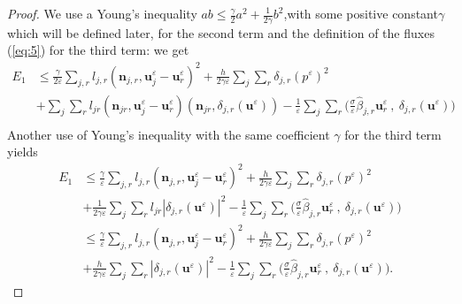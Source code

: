 \documentclass[a4paper,french,english,10pt]{article}
\newcommand\ljr{l_{jr}}
\newcommand\njr{\mathbf{n}_{jr}}
\newcommand\uu{\mathbf{u}}
\newcommand\eps{\varepsilon}
\begin{document}
\begin{proof}
We use a Young's inequality 
$ab\leq \frac\gamma2 a^2+\frac1{2\gamma} b^2$,with some positive constant$\gamma$ which will be defined later,   for the second term
and the definition of the fluxes (\ref{eq:5}) for the third term: we get
\begin{equation*}
\begin{aligned}
E_1 &\leq  \frac{\gamma }{2 \eps}\sum_{j,r}l_{j,r}(\textbf{n}_{j,r},\textbf{u}_j^{\eps}
-\textbf{u}_r^{\eps})^2 + \frac{h}{2\gamma\eps} \sum_j \sum_r  %
\delta_{j,r}(p^{\eps})^2 \\
&+
\sum_j \sum_r 
\ljr(\njr , \textbf{u}_j^{\eps}-\textbf{u}_r^{\eps} )(\njr ,
  \delta_{j,r}(\uu^{\eps}))
 -\frac{1}{\eps} \sum_j \sum_r \bigg(
\frac{\sigma}{\eps} \widehat{\beta}_{j,r}\textbf{u}_r^{\eps}\: , \:
\delta_{j,r}(\uu^{\eps} )\bigg) \\
\end{aligned}
\end{equation*}
Another use of Young's inequality with the same coefficient $\gamma$ for the third term
yields
\begin{equation*}
\begin{aligned}
E_1 &\leq  \frac{\gamma }{ \eps}\sum_{j,r}l_{j,r}(\textbf{n}_{j,r},\textbf{u}_j^{\eps}
-\textbf{u}_r^{\eps})^2 + \frac{h}{2\gamma\eps} \sum_j \sum_r %
\delta_{j,r}(p^{\eps})^2 
\\
&
+\frac{1}{2\gamma\eps} \sum_j \sum_r l_{jr}
|
\delta_{j,r}(\uu^{\eps})|^2 -\frac{1}{\eps} \sum_j \sum_r \bigg(
\frac{\sigma}{\eps} \widehat{\beta}_{j,r}\textbf{u}_r^{\eps}\: , \:
\delta_{j,r}(\uu^{\eps} )\bigg) \\
&\leq  \frac{\gamma }{ \eps}\sum_{j,r}l_{j,r}(\textbf{n}_{j,r},\textbf{u}_j^{\eps}
-\textbf{u}_r^{\eps})^2 + \frac{h}{2\gamma\eps} \sum_j \sum_r %
\delta_{j,r}(p^{\eps})^2 
\\
&
+\frac{h}{2\gamma\eps} \sum_j \sum_r 
|
\delta_{j,r}(\uu^{\eps})|^2 -\frac{1}{\eps} \sum_j \sum_r \bigg(
\frac{\sigma}{\eps} \widehat{\beta}_{j,r}\textbf{u}_r^{\eps}\: , \:
\delta_{j,r}(\uu^{\eps} )\bigg) .

\end{aligned}
\end{equation*}
\end{proof}
\end{document}
